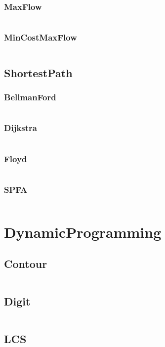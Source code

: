 \documentclass[a4paper,11pt]{article}
\begin{document}
\subsubsection{MaxFlow}
\inputminted[breaklines]{c++}{04++GraphTheory/+NetFlow/+MaxFlow.cpp}
\subsubsection{MinCostMaxFlow}
\inputminted[breaklines]{c++}{04++GraphTheory/+NetFlow/+MinCostMaxFlow.cpp}

\subsection{ShortestPath}
\subsubsection{BellmanFord}
\inputminted[breaklines]{c++}{04++GraphTheory/+ShortestPath/+BellmanFord.cpp}
\subsubsection{Dijkstra}
\inputminted[breaklines]{c++}{04++GraphTheory/+ShortestPath/+Dijkstra.cpp}
\subsubsection{Floyd}
\inputminted[breaklines]{c++}{04++GraphTheory/+ShortestPath/+Floyd.cpp}
\subsubsection{SPFA}
\inputminted[breaklines]{c++}{04++GraphTheory/+ShortestPath/+SPFA.cpp}


\newpage
\section{DynamicProgramming}
\subsection{Contour}
\inputminted[breaklines]{c++}{05++DynamicProgramming/+Contour.cpp}
\subsection{Digit}
\inputminted[breaklines]{c++}{05++DynamicProgramming/+Digit.cpp}
\subsection{LCS}
\inputminted[breaklines]{c++}{05++DynamicProgramming/+LCS.cpp}
\end{document}
